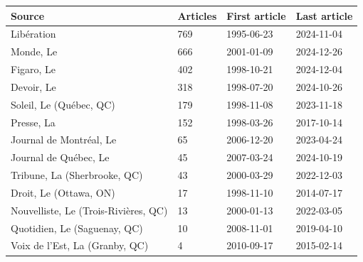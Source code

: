 \documentclass[
  man,
  floatsintext,
  longtable,
  nolmodern,
  notxfonts,
  notimes,
  mask,
  colorlinks=true,linkcolor=blue,citecolor=blue,urlcolor=blue]{apa7}
\begin{document}
\begin{table}

{\caption{{Collected Articles by Source
Media}{\label{tbl-source-summary}}}
\vspace{-20pt}}

\begin{longtable}[]{@{}llll@{}}
\toprule\noalign{}
Source & Articles & First article & Last article \\
\midrule\noalign{}
\endhead
\bottomrule\noalign{}
\endlastfoot
Libération & 769 & 1995-06-23 & 2024-11-04 \\
Monde, Le & 666 & 2001-01-09 & 2024-12-26 \\
Figaro, Le & 402 & 1998-10-21 & 2024-12-04 \\
Devoir, Le & 318 & 1998-07-20 & 2024-10-26 \\
Soleil, Le (Québec, QC) & 179 & 1998-11-08 & 2023-11-18 \\
Presse, La & 152 & 1998-03-26 & 2017-10-14 \\
Journal de Montréal, Le & 65 & 2006-12-20 & 2023-04-24 \\
Journal de Québec, Le & 45 & 2007-03-24 & 2024-10-19 \\
Tribune, La (Sherbrooke, QC) & 43 & 2000-03-29 & 2022-12-03 \\
Droit, Le (Ottawa, ON) & 17 & 1998-11-10 & 2014-07-17 \\
Nouvelliste, Le (Trois-Rivières, QC) & 13 & 2000-01-13 & 2022-03-05 \\
Quotidien, Le (Saguenay, QC) & 10 & 2008-11-01 & 2019-04-10 \\
Voix de l'Est, La (Granby, QC) & 4 & 2010-09-17 & 2015-02-14 \\
\end{longtable}

\end{table}
\end{document}
